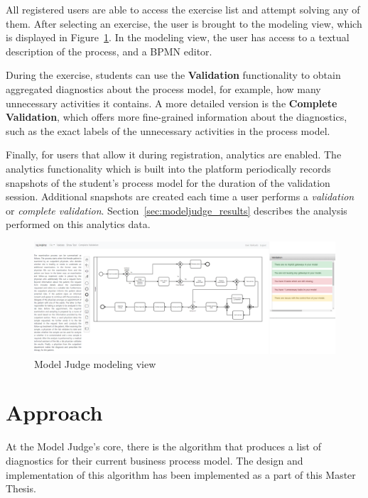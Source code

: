 All registered users are able to access the exercise list and attempt solving
any of them. After selecting an exercise, the user is brought to the modeling
view, which is displayed in Figure~\ref{fig:modeljudge_validation}. In the
modeling view, the user has access to a textual description of the process, and
a BPMN editor.

During the exercise, students can use the \textbf{Validation} functionality to
obtain aggregated diagnostics about the process model, for example, how many
unnecessary activities it contains. A more detailed version is the
\textbf{Complete Validation}, which offers more fine-grained information about
the diagnostics, such as the exact labels of the unnecessary activities in the
process model.

Finally, for users that allow it during registration, analytics are enabled. The
analytics functionality which is built into the platform periodically records
snapshots of the student's process model for the duration of the validation
session. Additional snapshots are created each time a user performs a
\textit{validation} or \textit{complete validation}.
Section~\ref{sec:modeljudge_results} describes the analysis performed on this
analytics data.

\begin{figure}[htb]
  \centering
  \includegraphics[width=\textwidth]{figures/validation}
  \caption{Model Judge modeling view}
  \label{fig:modeljudge_validation}
\end{figure}

\section{Approach}
\label{sec:modeljudge_approach}

At the Model Judge's core, there is the algorithm that produces a list of
diagnostics for their current business process model. The design and
implementation of this algorithm has been implemented as a part of this Master
Thesis.

